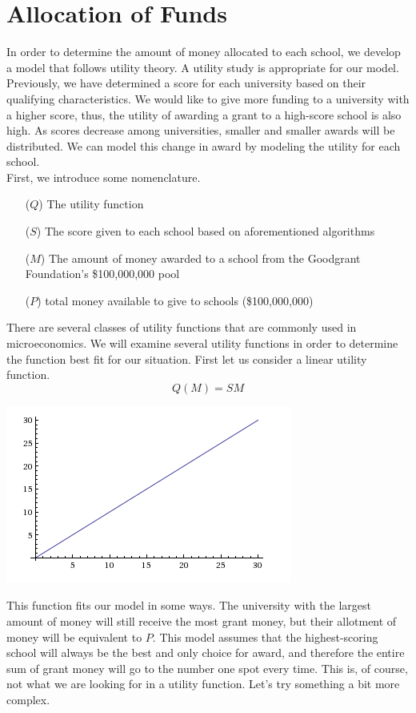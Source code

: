 \documentclass[paper.tex]{subfiles}
\begin{document}
	\section{Allocation of Funds}
	
	In order to determine the amount of money allocated to each school, we develop a model that follows utility theory. A utility study is appropriate for our model. Previously, we have determined a score for each university based on their qualifying characteristics. We would like to give more funding to a university with a higher score, thus, the utility of awarding a grant to a high-score school is also high. As scores decrease among universities, smaller and smaller awards will be distributed. We can model this change in award by modeling the utility for each school.
	\\
	
	First, we introduce some nomenclature.
	\begin{itemize}
		\item[($Q$)] The utility function
		\item[($S$)] The score given to each school based on aforementioned algorithms
		\item[($M$)] The amount of money awarded to a school from the Goodgrant Foundation's \$100,000,000 pool
		\item[($P$)] total money available to give to schools (\$100,000,000)
	\end{itemize}
	There are several classes of utility functions that are commonly used in microeconomics. We will examine several utility functions in order to determine the function best fit for our situation. First let us consider a linear utility function.
	$$ Q(M) = SM $$
	
	\begin{center}
		\includegraphics[width=0.5\linewidth]{images/UF1}
	\end{center}
	This function fits our model in some ways. The university with the largest amount of money will still receive the most grant money, but their allotment of money will be equivalent to $P$. This model assumes that the highest-scoring school will always be the best and only choice for award, and therefore the entire sum of grant money will go to the number one spot every time. This is, of course, not what we are looking for in a utility function. Let's try something a bit more complex.
	\\
	
\end{document}
